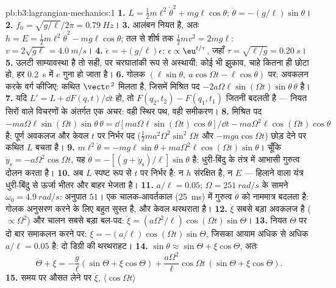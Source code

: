 \begin{solution}{pb:b3:lagrangian-mechanics:1}
\textbf{1.} $L = \tfrac12 m\ell^2\dot\theta^2 + mg\ell\cos\theta$;
$\ddot\theta = -(g/\ell)\sin\theta$।
\textbf{2.} $f_0 = \sqrt{g/\ell}/2\pi = \qty{0.79}{Hz}$।
\textbf{3.} आलंबन नियत है, अतः $h = E = \tfrac12
m\ell^2\dot\theta^2 - mg\ell\cos\theta$; तल से शीर्ष तक $\tfrac12
mv^2 = 2mg\ell$: $v = 2\sqrt{g\ell} = \qty{4.0}{m/s}$।
\textbf{4.} $\ddot\epsilon = +(g/\ell)\epsilon$: $\epsilon \propto
\eu^{t/\tau}$, जहाँ $\tau = \sqrt{\ell/g} = \qty{0.20}{s}$।
\textbf{5.} उलटी साम्यावस्था है तो सही, पर चरघातांकी रूप से
अस्थायी: कोई भी झुकाव, चाहे कितना ही छोटा हो, हर
\qty{0.2}{s} में $e$ गुना हो जाता है।
\textbf{6.} गोलक $(\ell\sin\theta,\ a\cos\Omega t - \ell\cos\theta)$ पर;
अवकलन करके वर्ग कीजिए: कथित $\vect v^{\,2}$ मिलता है, जिसमें मिश्रित
पद $-2a\Omega\ell\sin(\Omega t)\sin\theta\,\dot\theta$ है।
\textbf{7.} यदि $L' = L + \dd F(q,t)/\dd t$ हो, तो 
$F(q_2, t_2) - F(q_1, t_1)$ जितनी बदलती है --- नियत सिरों वाले
विचरणों के अंतर्गत एक अचर: वही स्थिर पथ, वही समीकरण।
\textbf{8.} मिश्रित पद $-ma\Omega\ell\sin(\Omega t)\sin\theta\,
\dot\theta = \dd[ma\Omega\ell\sin(\Omega t)\cos\theta]/\dd t -
ma\Omega^2\ell\cos(\Omega t)\cos\theta$ है; पूर्ण अवकलज और केवल
$t$ पर निर्भर पद ($\tfrac12 ma^2\Omega^2\sin^2\Omega t$ और
$-mga\cos\Omega t$) छोड़ देने पर कथित $L$ बचता है।
\textbf{9.} $m\ell^2\ddot\theta = -mg\ell\sin\theta +
ma\Omega^2\ell\cos(\Omega t)\sin\theta$। चूँकि $\ddot y_{\text{s}} =
-a\Omega^2\cos\Omega t$, यह $\ddot\theta =
-[(g + \ddot y_{\text{s}})/\ell]\sin\theta$ है: धुरी-बिंदु के तंत्र में
आभासी गुरुत्व दोलन करता है।
\textbf{10.} अब $L$ स्पष्ट रूप से $t$ पर निर्भर है: न $h$ संरक्षित है,
न $E$ --- हिलाने वाला यंत्र धुरी-बिंदु से ऊर्जा भीतर और बाहर भेजता है।
\textbf{11.} $a/\ell = 0.05$; $\Omega = \qty{251}{rad/s}$ के सामने
$\omega_0 = \qty{4.9}{rad/s}$: अनुपात $51$। एक चालक-आवर्तकाल
(\qty{25}{ms}) में गुरुत्व $\dot\theta$ को नाममात्र बदलता है: गोलक
अनुसरण करने के लिए बहुत सुस्त है, और केवल थरथराता है।
\textbf{12.} $\ddot\xi$ सबसे बड़ा अवकलज है ($\propto\Omega^2$)
और चालन सबसे बड़ा बल-पद: $\ddot\xi =
(a\Omega^2/\ell)\cos(\Omega t)\sin\Theta$।
\textbf{13.} नियत $\Theta$ पर दो बार समाकलन करने पर: $\xi =
-(a/\ell)\cos(\Omega t)\sin\Theta$, जिसका आयाम अधिक से अधिक $a/\ell =
0.05$ है: दो डिग्री की थरथराहट।
\textbf{14.} $\sin\theta \approx \sin\Theta + \xi\cos\Theta$, अतः
\[
\ddot\Theta + \ddot\xi = -\frac{g}{\ell}(\sin\Theta + \xi\cos\Theta)
 + \frac{a\Omega^2}{\ell}\cos\Omega t\,(\sin\Theta + \xi\cos\Theta) .
\]
\textbf{15.} समय पर औसत लेने पर $\ddot\xi$, $\langle\cos\Omega t\rangle$

\end{solution}
